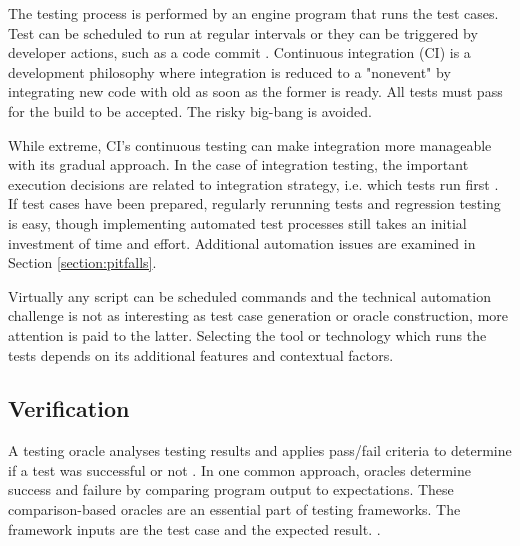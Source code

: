 \documentclass[12pt,a4paper,oneside,pdftex]{report}
\begin{document}
The testing process is performed by an engine program that runs the test cases. Test can be scheduled to run at regular intervals or they can be triggered by developer actions, such as a code commit \citep{pezze2008software}. Continuous integration (CI) is a development philosophy where integration is reduced to a "nonevent" by integrating new code with old as soon as the former is ready. All tests must pass for the build to be accepted. \citep{duvall2007continuous} The risky big-bang is avoided.

While extreme, CI's continuous testing can make integration more manageable with its gradual approach. In the case of integration testing, the important execution decisions are related to integration strategy, i.e. which tests run first \citep{duvall2007continuous}. If test cases have been prepared, regularly rerunning tests and regression testing is easy, though implementing automated test processes still takes an initial investment of time and effort. Additional automation issues are examined in Section \ref{section:pitfalls}.

Virtually any script can be scheduled commands and the technical automation challenge is not as interesting as test case generation or oracle construction, more attention is paid to the latter. Selecting the tool or technology which runs the tests depends on its additional features and contextual factors.


\subsection{Verification}
A testing oracle analyses testing results and applies pass/fail criteria to determine if a test was successful or not \citep{pezze2008software, burnstein2003practical}. In one common approach, oracles determine success and failure by comparing program output to expectations. These comparison-based oracles are an essential part of testing frameworks. The framework inputs are the test case and the expected result. \citep{pezze2008software}. 
\end{document}
